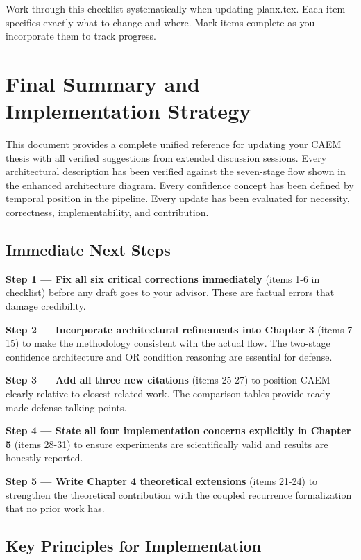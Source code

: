 \documentclass[11pt,a4paper]{article}
\begin{document}
Work through this checklist systematically when updating planx.tex. Each item specifies exactly what to change and where. Mark items complete as you incorporate them to track progress.

\vfill

\section{Final Summary and Implementation Strategy}

This document provides a complete unified reference for updating your CAEM thesis with all verified suggestions from extended discussion sessions. Every architectural description has been verified against the seven-stage flow shown in the enhanced architecture diagram. Every confidence concept has been defined by temporal position in the pipeline. Every update has been evaluated for necessity, correctness, implementability, and contribution.

\subsection{Immediate Next Steps}

\textbf{Step 1 — Fix all six critical corrections immediately} (items 1-6 in checklist) before any draft goes to your advisor. These are factual errors that damage credibility.

\textbf{Step 2 — Incorporate architectural refinements into Chapter 3} (items 7-15) to make the methodology consistent with the actual flow. The two-stage confidence architecture and OR condition reasoning are essential for defense.

\textbf{Step 3 — Add all three new citations} (items 25-27) to position CAEM clearly relative to closest related work. The comparison tables provide ready-made defense talking points.

\textbf{Step 4 — State all four implementation concerns explicitly in Chapter 5} (items 28-31) to ensure experiments are scientifically valid and results are honestly reported.

\textbf{Step 5 — Write Chapter 4 theoretical extensions} (items 21-24) to strengthen the theoretical contribution with the coupled recurrence formalization that no prior work has.

\subsection{Key Principles for Implementation}
\end{document}
